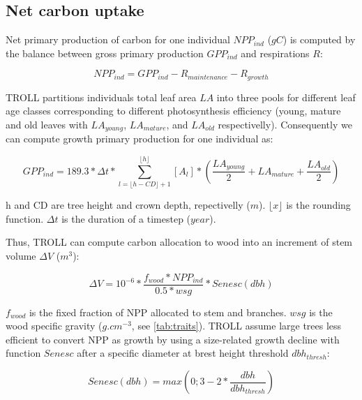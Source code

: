 \documentclass[]{article}
\theoremstyle{definition}
\theoremstyle{definition}
\theoremstyle{remark}
\begin{document}
\subsection{Net carbon uptake}\label{net-carbon-uptake}

Net primary production of carbon for one individual \(NPP_{ind}\)
(\(gC\)) is computed by the balance between gross primary production
\(GPP_{ind}\) and respirations \(R\):

\begin{equation}
  NPP_{ind} = GPP_{ind} - R_{maintenance} - R_{growth}
  \label{eq:NPP}
\end{equation}

TROLL partitions individuals total leaf area \(LA\) into three pools for
different leaf age classes corresponding to different photosynthesis
efficiency (young, mature and old leaves with \(LA_{young}\),
\(LA_{mature}\), and \(LA_{old}\) respectivelly). Consequently we can
compute growth primary production for one individual as:

\begin{equation}
  GPP_{ind} = 189.3 * \Delta t * \sum _{l= \lfloor h-CD \rfloor +1} ^{\lfloor h \rfloor} [A_l] * (\frac{LA_{young}}{2} + LA_{mature} + \frac{LA_{old}}{2})
  \label{eq:GPP}
\end{equation}

h and CD are tree height and crown depth, repectivelly (\(m\)).
\(\lfloor x \rfloor\) is the rounding function. \(\Delta t\) is the
duration of a timestep (\(year\)).

Thus, TROLL can compute carbon allocation to wood into an increment of
stem volume \(\Delta V\) (\(m^3\)):

\begin{equation}
  \Delta V = 10^{-6} * \frac{f_{wood}*NPP_{ind}}{0.5*wsg}*Senesc(dbh)
  \label{eq:DeltaV}
\end{equation}

\(f_{wood}\) is the fixed fraction of NPP allocated to stem and
branches. \(wsg\) is the wood specific gravity (\(g.cm^{-3}\), see
\ref{tab:traits}). TROLL assume large trees less efficient to convert
NPP as growth by using a size-related growth decline with function
\(Senesc\) after a specific diameter at brest height threshold
\(dbh_{thresh}\):

\begin{equation}
  Senesc(dbh) = max(0;3-2*\frac{dbh}{dbh_{thresh}})
  \label{eq:Senesc}
\end{equation}
\end{document}
